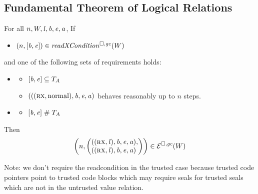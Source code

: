 \documentclass[a4paper]{article}
\begin{document}
\subsection{Fundamental Theorem of Logical Relations}
\begin{theorem}[FTLR]
  \label{thm:ftlr}
  For all $n,W,\mathit{l},\mathit{b},\mathit{e},\mathit{a}$,
  If
  \begin{itemize}
  \item $\npair{[\baddr,\eaddr]} \in \xReadCond{W}$
  \end{itemize}
  and one of the following sets of requirements holds:
  \begin{itemize}
  \item \begin{itemize}
    \item $[\mathit{b},\mathit{e}] \subseteq T_{A}$
    \item $({((\textsc{rx},\mathrm{normal}),\mathit{b},\mathit{e},\mathit{a})}$ behaves reasonably up to $n$ steps.
    \end{itemize}
  \item
    \begin{itemize}
    \item $[\mathit{b},\mathit{e}] \mathrel{\#} T_{A}$
    \end{itemize}
  \end{itemize}
  Then
  \[
    \npair{\left(\arraycolsep=0pt\array{l}((\rx,\lin),\baddr,\eaddr,\aaddr),\\
      ((\rx,\lin),\baddr,\eaddr,\aaddr)\endarray\right)} \in \lre(W)
  \]
\end{theorem}
Note: we don't require the readcondition in the trusted case because trusted code pointers point to trusted code blocks which may require seals for trusted seals which are not in the untrusted value relation.
\end{document}
